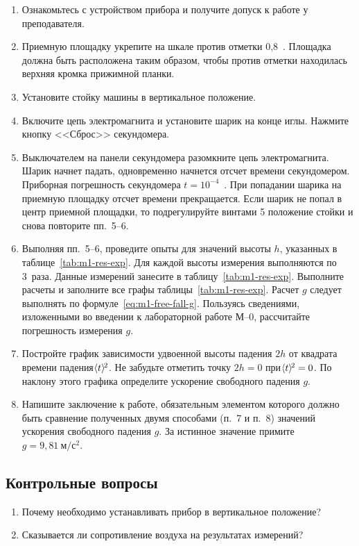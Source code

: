 \documentclass[a4paper, 12pt]{extarticle}
\begin{document}
\begin{enumerate}
\item Ознакомьтесь с устройством прибора и получите допуск к работе у преподавателя. 
\item Приемную площадку укрепите на шкале против отметки 0,8~. Площадка должна быть расположена таким образом, чтобы против отметки находилась верхняя кромка прижимной планки.
\item Установите стойку машины в вертикальное положение.
\item Включите цепь электромагнита и установите шарик на конце иглы. Нажмите кнопку <<Сброс>> секундомера.
\item Выключателем на панели секундомера разомкните цепь электромагнита. Шарик начнет падать, одновременно начнется отсчет времени секундомером. Приборная погрешность секундомера $t = 10^{-4}$~. При попадании шарика на приемную площадку отсчет времени прекращается. Если шарик не попал в центр приемной площадки, то подрегулируйте винтами 5 положение стойки и снова повторите пп.~5--6. %
\item Выполняя пп.~5--6, проведите опыты для значений высоты $h$, указанных в таблице~\ref{tab:m1-res-exp}. Для каждой высоты измерения выполняются по 3~раза. Данные измерений занесите в таблицу~\ref{tab:m1-res-exp}. Выполните расчеты и заполните все графы таблицы~\ref{tab:m1-res-exp}. Расчет $g$ следует выполнять по формуле~\eqref{eq:m1-free-fall-g}. Пользуясь сведениями, изложенными во введении к лабораторной работе М--0, рассчитайте погрешность измерения $g$. %
\item Постройте график зависимости удвоенной высоты падения $2h$ от квадрата времени падения $\hspace{-3pt}\left<t\right>\hspace{-3pt}^2$. Не забудьте отметить точку $2h = 0$ при $\hspace{-3pt}\left<t\right>\hspace{-3pt}^2 = 0$. По наклону этого графика определите ускорение свободного падения $g$.
\item Напишите заключение к работе, обязательным элементом которого должно быть сравнение полученных двумя способами (п.~7 и п.~8) значений ускорения свободного падения $g$. За истинное значение примите $g = 9,81\   \text{м}/\text{с}^2$. %
\end{enumerate}

\subsection{Контрольные вопросы}
\begin{enumerate}
\item Почему необходимо устанавливать прибор в вертикальное положение? %
\item Сказывается ли сопротивление воздуха на результатах измерений?
\end{enumerate}
\end{document}
